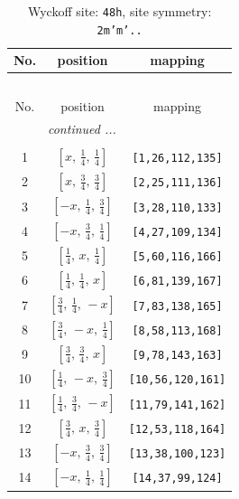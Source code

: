 \documentclass[fleqn,8pt]{jsarticle}
\begin{document}
\begin{longtable}{ccc}
\caption{Wyckoff site: {\tt 48h}, site symmetry: {\tt 2m'm'..}}
 \\
 \hline \hline
No. & position & mapping \\ \hline \endfirsthead

\multicolumn{2}{l}{\tablename\ \thetable{}} \\
 \hline \hline
No. & position & mapping \\ \hline \endhead

 \hline \hline
\multicolumn{2}{r}{\footnotesize\it continued ...} \\ \endfoot

 \hline \hline
\multicolumn{2}{r}{} \\ \endlastfoot

1 & $\left[ x,\, \frac{1}{4},\, \frac{1}{4} \right]$ & {\tt [1,26,112,135]} \\ \hline
2 & $\left[ x,\, \frac{3}{4},\, \frac{3}{4} \right]$ & {\tt [2,25,111,136]} \\ \hline
3 & $\left[ - x,\, \frac{1}{4},\, \frac{3}{4} \right]$ & {\tt [3,28,110,133]} \\ \hline
4 & $\left[ - x,\, \frac{3}{4},\, \frac{1}{4} \right]$ & {\tt [4,27,109,134]} \\ \hline
5 & $\left[ \frac{1}{4},\, x,\, \frac{1}{4} \right]$ & {\tt [5,60,116,166]} \\ \hline
6 & $\left[ \frac{1}{4},\, \frac{1}{4},\, x \right]$ & {\tt [6,81,139,167]} \\ \hline
7 & $\left[ \frac{3}{4},\, \frac{1}{4},\, - x \right]$ & {\tt [7,83,138,165]} \\ \hline
8 & $\left[ \frac{3}{4},\, - x,\, \frac{1}{4} \right]$ & {\tt [8,58,113,168]} \\ \hline
9 & $\left[ \frac{3}{4},\, \frac{3}{4},\, x \right]$ & {\tt [9,78,143,163]} \\ \hline
10 & $\left[ \frac{1}{4},\, - x,\, \frac{3}{4} \right]$ & {\tt [10,56,120,161]} \\ \hline
11 & $\left[ \frac{1}{4},\, \frac{3}{4},\, - x \right]$ & {\tt [11,79,141,162]} \\ \hline
12 & $\left[ \frac{3}{4},\, x,\, \frac{3}{4} \right]$ & {\tt [12,53,118,164]} \\ \hline
13 & $\left[ - x,\, \frac{3}{4},\, \frac{3}{4} \right]$ & {\tt [13,38,100,123]} \\ \hline
14 & $\left[ - x,\, \frac{1}{4},\, \frac{1}{4} \right]$ & {\tt [14,37,99,124]} \\ \hline

\end{longtable}
\end{document}
